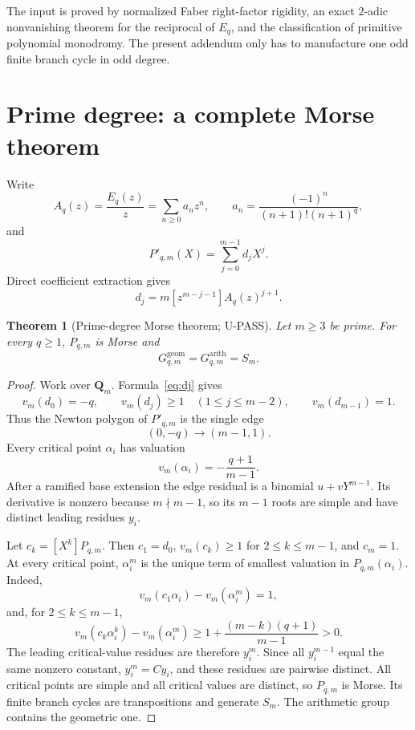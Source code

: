 \documentclass[11pt]{article}
\theoremstyle{keio}
\newtheorem{theorem}{Theorem}[section]
\theoremstyle{keioinput}
\newcommand{\UPASS}{\textcolor{passgreen}{\textsf{U-PASS}}}
\newcommand{\Q}{\mathbf{Q}}
\begin{document}
The input is proved by normalized Faber right-factor rigidity, an exact
$2$-adic nonvanishing theorem for the reciprocal of $E_q$, and the
classification of primitive polynomial monodromy. The present addendum
only has to manufacture one odd finite branch cycle in odd degree.

\section{Prime degree: a complete Morse theorem}

Write
\[
A_q(z)=\frac{E_q(z)}z
=\sum_{n\ge0}a_nz^n,
\qquad
a_n=\frac{(-1)^n}{(n+1)!(n+1)^q},
\]
and
\[
P'_{q,m}(X)=\sum_{j=0}^{m-1}d_jX^j.
\]
Direct coefficient extraction gives
\begin{equation}
\boxed{d_j=m[z^{m-j-1}]A_q(z)^{j+1}.}
\label{eq:dj}
\end{equation}

\begin{theorem}[Prime-degree Morse theorem; \UPASS]\label{thm:prime}
Let $m\ge3$ be prime. For every $q\ge1$, $P_{q,m}$ is Morse and
\begin{equation}
\boxed{G^{\mathrm{geom}}_{q,m}=G^{\mathrm{arith}}_{q,m}=S_m.}
\label{eq:prime-mon}
\end{equation}
\end{theorem}

\begin{proof}
Work over $\Q_m$. Formula~\eqref{eq:dj} gives
\[
v_m(d_0)=-q,
\qquad
v_m(d_j)\ge1\quad(1\le j\le m-2),
\qquad
v_m(d_{m-1})=1.
\]
Thus the Newton polygon of $P'_{q,m}$ is the single edge
\[
(0,-q)\longrightarrow(m-1,1).
\]
Every critical point $\alpha_i$ has valuation
\[
v_m(\alpha_i)=-\frac{q+1}{m-1}.
\]
After a ramified base extension the edge residual is a binomial
$u+vY^{m-1}$. Its derivative is nonzero because $m\nmid m-1$, so its
$m-1$ roots are simple and have distinct leading residues $y_i$.

Let $c_k=[X^k]P_{q,m}$. Then $c_1=d_0$, $v_m(c_k)\ge1$ for
$2\le k\le m-1$, and $c_m=1$. At every critical point,
$\alpha_i^m$ is the unique term of smallest valuation in
$P_{q,m}(\alpha_i)$. Indeed,
\[
v_m(c_1\alpha_i)-v_m(\alpha_i^m)=1,
\]
and, for $2\le k\le m-1$,
\[
v_m(c_k\alpha_i^k)-v_m(\alpha_i^m)
\ge1+\frac{(m-k)(q+1)}{m-1}>0.
\]
The leading critical-value residues are therefore $y_i^m$. Since all
$y_i^{m-1}$ equal the same nonzero constant, $y_i^m=Cy_i$, and these
residues are pairwise distinct. All critical points are simple and all
critical values are distinct, so $P_{q,m}$ is Morse. Its finite branch
cycles are transpositions and generate $S_m$. The arithmetic group contains
the geometric one.
\end{proof}
\end{document}
